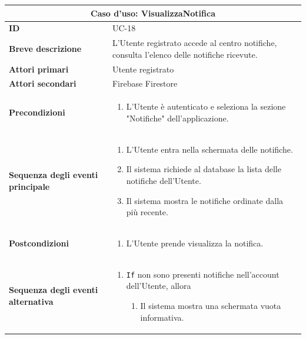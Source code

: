 \documentclass[a4paper]{report}
\begin{document}
\begin{table}[H]
\vspace*{-0cm}
\renewcommand{\arraystretch}{1.9}
\begin{tabular}{|p{3.9cm}|p{9.9cm}|}
\hline
\multicolumn{2}{|c|}{\textbf{Caso d’uso: VisualizzaNotifica}} \\ \hline
\textbf{ID} & UC-18 \\ \hline
\textbf{Breve descrizione} & L'Utente registrato accede al centro notifiche, consulta l'elenco delle notifiche ricevute. \\ \hline
\textbf{Attori primari} & Utente registrato \\ \hline
\textbf{Attori secondari} & Firebase Firestore \\ \hline
\textbf{Precondizioni} & \begin{enumerate}[leftmargin=14pt,label=\arabic*.,labelsep=0.5em,topsep=0pt,partopsep=0pt,parsep=0pt,itemsep=0pt]
    \item L'Utente è autenticato e seleziona la sezione "Notifiche" dell'applicazione.
\end{enumerate} \\ \hline
\textbf{Sequenza degli eventi principale} &
\begin{enumerate}[leftmargin=14pt,label=\arabic*.,labelsep=0.5em,topsep=0pt,partopsep=0pt,parsep=0pt,itemsep=0pt]
   \item L'Utente entra nella schermata delle notifiche.
   \item Il sistema richiede al database la lista delle notifiche dell'Utente.
   \item Il sistema mostra le notifiche ordinate dalla più recente.
\end{enumerate}\\ \hline
\textbf{Postcondizioni} &
\begin{enumerate}[leftmargin=14pt,label=\arabic*.,labelsep=0.5em,topsep=0pt,partopsep=0pt,parsep=0pt,itemsep=0pt]
\item L'Utente prende visualizza la notifica.
\end{enumerate} \\ \hline
\textbf{Sequenza degli eventi alternativa} & \begin{enumerate}[leftmargin=14pt,label=\arabic*.,labelsep=0.5em,topsep=0pt,partopsep=0pt,parsep=0pt,itemsep=0pt]
   \item \texttt{If} non sono presenti notifiche nell'account dell'Utente, allora
   \begin{enumerate}[label=\arabic{enumi}.\arabic*.,leftmargin=22pt,labelsep=0.5em,topsep=0pt,partopsep=0pt,parsep=0pt,itemsep=0pt]
       \item Il sistema mostra una schermata vuota informativa.
   \end{enumerate}
\end{enumerate}\\ \hline
\end{tabular}
\end{table}
\end{document}
